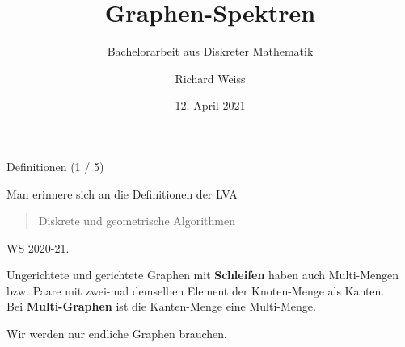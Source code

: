 \documentclass[aspectratio=169]{beamer}
\title[Graphen-Spektren]{Graphen-Spektren}
\subtitle{Bachelorarbeit aus Diskreter Mathematik}
\author[R. Weiss]{Richard Weiss}
\institute[TU Wien]{TU Wien, Vienna, Austria}
\date{12. April 2021}
\begin{document}
\begin{frame}
    \titlepage
\end{frame}            


\begin{frame}{Definitionen (1 / 5)}

    Man erinnere sich an die Definitionen der LVA \blockquote{Diskrete und geometrische Algorithmen} WS 2020-21.

    \begin{definition*}
        Ungerichtete und gerichtete Graphen mit \textbf{Schleifen} haben auch Multi-Mengen bzw. Paare mit zwei-mal demselben Element der Knoten-Menge als Kanten. \\
        Bei \textbf{Multi-Graphen} ist die Kanten-Menge eine Multi-Menge.
    \end{definition*}

    Wir werden nur endliche Graphen brauchen.

\end{frame}
\end{document}
